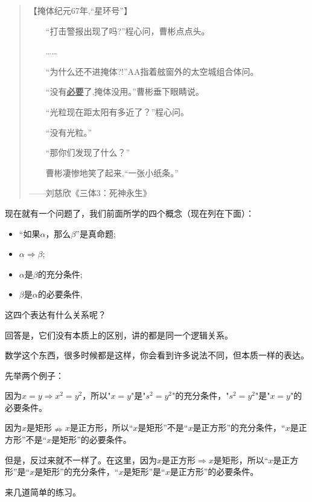 \documentclass[lang=cn,math=cm,chinesefont=nofont,11pt,scheme=chinese,onecol]{elegantbook}
\begin{document}
\begin{quotation}
  【掩体纪元67年,“星环号”】

　　“打击警报出现了吗?”程心问，曹彬点点头。

　　……

　　“为什么还不进掩体?!”AA指着舷窗外的太空城组合体问。

　　“没有\underline{\textbf{必要}}了,掩体没用。”曹彬垂下眼睛说。

　　“光粒现在距太阳有多近了？”程心问。

　　“没有光粒。”

　　“那你们发现了什么？”

　　曹彬凄惨地笑了起来,“一张小纸条。”

——刘慈欣《三体3：死神永生》
\end{quotation}

现在就有一个问题了，我们前面所学的四个概念（现在列在下面）：
\begin{itemize}
  \item “如果$\alpha$，那么$\beta$”是真命题;
  \item $\alpha\Rightarrow\beta$;
  \item $\alpha$是$\beta$的充分条件;
  \item $\beta$是$\alpha$的必要条件,
\end{itemize}

这四个表达有什么关系呢？

回答是，它们没有本质上的区别，讲的都是同一个逻辑关系。

数学这个东西，很多时候都是这样，你会看到许多说法不同，但本质一样的表达。

\hspace*{\fill}

先举两个例子：

\begin{example}\label{202406262001}
  因为$x=y\Rightarrow x^2=y^2$，所以"$x=y$"是"$s^2=y^2$"的充分条件，"$s^2=y^2$"是"$x=y$"的必要条件。
\end{example}

\begin{example}\label{202406262002}
  因为$x$是矩形$\nRightarrow x$是正方形，所以“$x$是矩形”不是“$x$是正方形”的充分条件，“$x$是正方形”不是“$x$是矩形”的必要条件。

  但是，反过来就不一样了。在这里，因为$x$是正方形$\Rightarrow x$是矩形，所以“$x$是正方形”是“$x$是矩形”的充分条件，“$x$是矩形”是“$x$是正方形”的必要条件。
\end{example}

来几道简单的练习。
\end{document}
